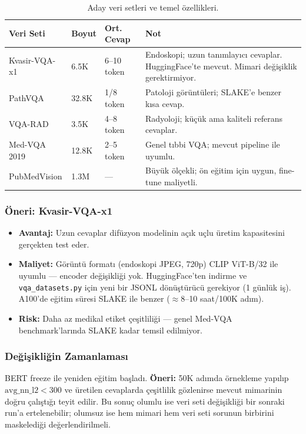 \documentclass[12pt,a4paper]{article}
\begin{document}
\begin{table}[H]
\centering
\begin{tabular}{p{3.2cm}p{2cm}p{2cm}p{6cm}}
\toprule
\textbf{Veri Seti} & \textbf{Boyut} & \textbf{Ort. Cevap} & \textbf{Not} \\
\midrule
Kvasir-VQA-x1       & 6.5K  & 6--10 token & Endoskopi; uzun tanımlayıcı cevaplar. HuggingFace'te mevcut. Mimari değişiklik gerektirmiyor. \\
PathVQA             & 32.8K & 1/8 token   & Patoloji görüntüleri; SLAKE'e benzer kısa cevap. \\
VQA-RAD             & 3.5K  & 4--8 token  & Radyoloji; küçük ama kaliteli referans cevaplar. \\
Med-VQA 2019        & 12.8K & 2--5 token  & Genel tıbbi VQA; mevcut pipeline ile uyumlu. \\
PubMedVision        & 1.3M  & ---         & Büyük ölçekli; ön eğitim için uygun, fine-tune maliyetli. \\
\bottomrule
\end{tabular}
\caption{Aday veri setleri ve temel özellikleri.}
\end{table}

\subsubsection{Öneri: Kvasir-VQA-x1}

\begin{itemize}
    \item \textbf{Avantaj:} Uzun cevaplar difüzyon modelinin açık uçlu üretim kapasitesini gerçekten test eder.
    \item \textbf{Maliyet:} Görüntü formatı (endoskopi JPEG, 720p) CLIP ViT-B/32 ile uyumlu --- encoder değişikliği yok. HuggingFace'ten indirme ve \texttt{vqa\_datasets.py} için yeni bir JSONL dönüştürücü gerekiyor (1 günlük iş). A100'de eğitim süresi SLAKE ile benzer ($\approx$8--10 saat/100K adım).
    \item \textbf{Risk:} Daha az medikal etiket çeşitliliği --- genel Med-VQA benchmark'larında SLAKE kadar temsil edilmiyor.
\end{itemize}

\subsubsection{Değişikliğin Zamanlaması}

BERT freeze ile yeniden eğitim başladı. \textbf{Öneri:} 50K adımda örnekleme yapılıp $\text{avg\_nn\_l2} < 300$ ve üretilen cevaplarda çeşitlilik gözlenirse mevcut mimarinin doğru çalıştığı teyit edilir. Bu sonuç olumlu ise veri seti değişikliği bir sonraki run'a ertelenebilir; olumsuz ise hem mimari hem veri seti sorunun birbirini maskelediği değerlendirilmeli.
\end{document}
